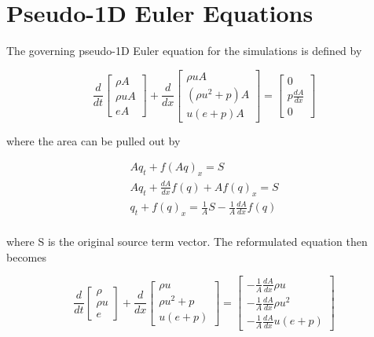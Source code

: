 \documentclass{article}%
\numberwithin{equation}{section}
\begin{document}
\section{Pseudo-1D Euler Equations}
The governing pseudo-1D Euler equation for the simulations is defined by

\begin{equation}
\frac{d}{dt} \left[ \begin{array}{c} \rho A \\ \rho u A \\ e A \end{array} \right] + \frac{d}{dx} \left[ \begin{array}{c} \rho u A \\ (\rho u^2 + p) A \\ u(e + p)A \end{array} \right] = \left[ \begin{array}{c} 0 \\ p \frac{dA}{dx} \\ 0 \end{array} \right] \label{psuedoeuler}
\end{equation}

where the area can be pulled out by

\begin{equation*}
\begin{split}
A q_t + f(A q)_x = S \\
A q_t + \frac{dA}{dx} f(q) + A f(q)_x = S \\
q_t + f(q)_x = \frac{1}{A}S - \frac{1}{A} \frac{dA}{dx} f(q) \\
\end{split}
\end{equation*}

where S is the original source term vector. The reformulated equation then becomes 

\begin{equation}
\frac{d}{dt} \left[ \begin{array}{c} \rho  \\ \rho u  \\ e \end{array} \right] + \frac{d}{dx} \left[ \begin{array}{c} \rho u  \\ \rho u^2 + p \\ u(e + p) \end{array} \right] = \left[ \begin{array}{c} -\frac{1}{A}\frac{dA}{dx} \rho u \\ -\frac{1}{A} \frac{dA}{dx} \rho u^2  \\ -\frac{1}{A} \frac{dA}{dx}  u(e + p) \end{array} \right]
\end{equation}
\end{document}
